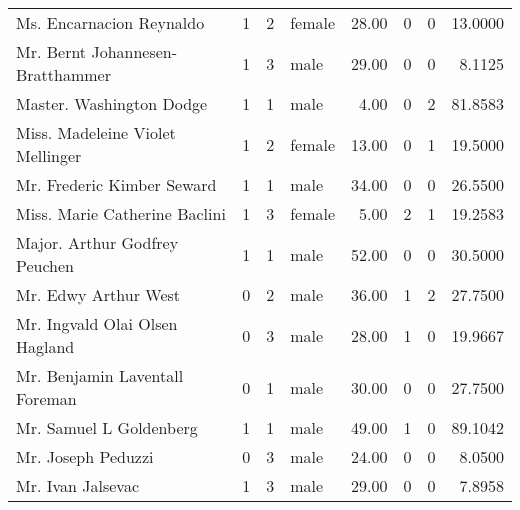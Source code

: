 \begin{tabular}{lrrlrrrr}
Ms. Encarnacion Reynaldo                           &         1 &       2 &  female &  28.00 &                        0 &                        0 &   13.0000 \\
Mr. Bernt Johannesen-Bratthammer                   &         1 &       3 &    male &  29.00 &                        0 &                        0 &    8.1125 \\
Master. Washington Dodge                           &         1 &       1 &    male &   4.00 &                        0 &                        2 &   81.8583 \\
Miss. Madeleine Violet Mellinger                   &         1 &       2 &  female &  13.00 &                        0 &                        1 &   19.5000 \\
Mr. Frederic Kimber Seward                         &         1 &       1 &    male &  34.00 &                        0 &                        0 &   26.5500 \\
Miss. Marie Catherine Baclini                      &         1 &       3 &  female &   5.00 &                        2 &                        1 &   19.2583 \\
Major. Arthur Godfrey Peuchen                      &         1 &       1 &    male &  52.00 &                        0 &                        0 &   30.5000 \\
Mr. Edwy Arthur West                               &         0 &       2 &    male &  36.00 &                        1 &                        2 &   27.7500 \\
Mr. Ingvald Olai Olsen Hagland                     &         0 &       3 &    male &  28.00 &                        1 &                        0 &   19.9667 \\
Mr. Benjamin Laventall Foreman                     &         0 &       1 &    male &  30.00 &                        0 &                        0 &   27.7500 \\
Mr. Samuel L Goldenberg                            &         1 &       1 &    male &  49.00 &                        1 &                        0 &   89.1042 \\
Mr. Joseph Peduzzi                                 &         0 &       3 &    male &  24.00 &                        0 &                        0 &    8.0500 \\
Mr. Ivan Jalsevac                                  &         1 &       3 &    male &  29.00 &                        0 &                        0 &    7.8958 \\

\end{tabular}
